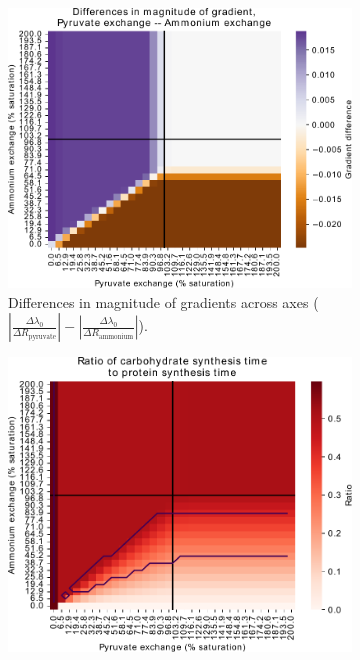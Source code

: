 \begin{figure}
\begin{subfigure}[t]{0.45\textwidth}
{    }
    \label{fig:model-grid-pyr-growthrate}
  \end{subfigure}
  \begin{subfigure}[t]{0.45\textwidth}
  \centering
    \includegraphics[width=\linewidth]{ec_grid_pyr_amm_gradient_compare}
    \caption{
      Differences in magnitude of gradients across axes ($|\frac{\Delta \lambda_{0}}{\Delta R_{\mathrm{pyruvate}}}| - |\frac{\Delta \lambda_{0}}{\Delta R_{\mathrm{ammonium}}}|$).
    }
    \label{fig:model-grid-pyr-gradient-compare}
  \end{subfigure}%
  \begin{subfigure}[t]{0.45\textwidth}
  \centering
    \includegraphics[width=\linewidth]{ec_grid_pyr_amm_carb_to_prot}

\end{subfigure}
\end{figure}
